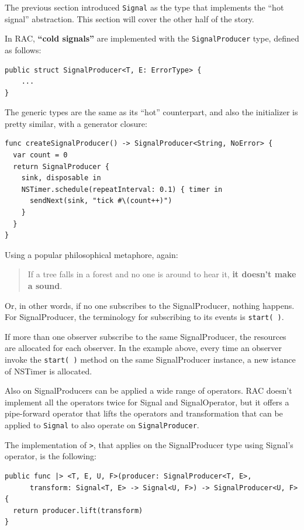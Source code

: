 The previous section introduced \texttt{Signal} as the type that
implements the ``hot signal'' abstraction. This section will cover the
other half of the story.

In RAC, \textbf{``cold signals''} are implemented with the
\texttt{SignalProducer} type, defined as follows:

\begin{verbatim}
public struct SignalProducer<T, E: ErrorType> {
    ...
}
\end{verbatim}

The generic types are the same as its ``hot'' counterpart, and also the
initializer is pretty similar, with a generator closure:

\begin{verbatim}
func createSignalProducer() -> SignalProducer<String, NoError> {
  var count = 0
  return SignalProducer {
    sink, disposable in
    NSTimer.schedule(repeatInterval: 0.1) { timer in
      sendNext(sink, "tick #\(count++)")
    }
  }
}
\end{verbatim}

Using a popular philosophical metaphore, again:

\begin{quote}
If a tree falls in a forest and no one is around to hear it, \textbf{it
doesn't make a sound}.
\end{quote}

Or, in other words, if no one subscribes to the SignalProducer, nothing
happens. For SignalProducer, the terminology for subscribing to its
events is \texttt{start(\ )}.

If more than one observer subscribe to the same SignalProducer, the
resources are allocated for each observer. In the example above, every
time an observer invoke the \texttt{start(\ )} method on the same
SignalProducer instance, a new istance of NSTimer is allocated.

Also on SignalProducers can be applied a wide range of operators. RAC
doesn't implement all the operators twice for Signal and SignalOperator,
but it offers a pipe-forward operator that lifts the operators and
transformation that can be applied to \texttt{Signal} to also operate on
\texttt{SignalProducer}.

The implementation of \texttt{\textbar{}\textgreater{}}, that applies on
the SignalProducer type using Signal's operator, is the following:

\begin{verbatim}
public func |> <T, E, U, F>(producer: SignalProducer<T, E>,
      transform: Signal<T, E> -> Signal<U, F>) -> SignalProducer<U, F> {
  return producer.lift(transform)
}
\end{verbatim}

